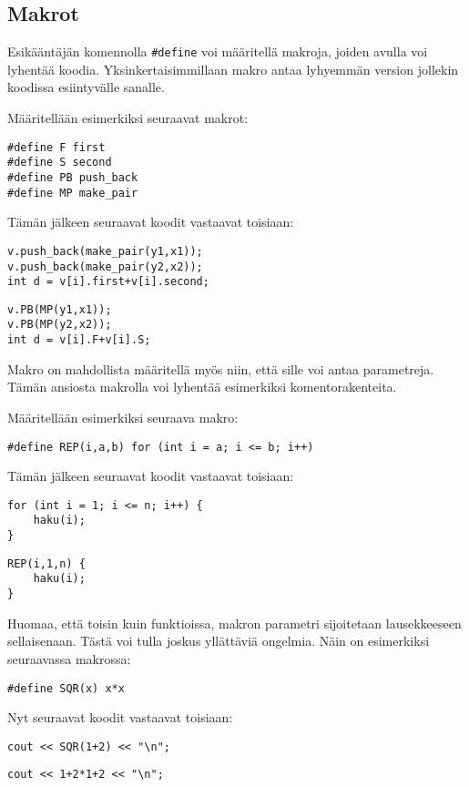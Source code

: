 \subsection{Makrot}

Esikääntäjän komennolla \texttt{\#define}
voi määritellä makroja, joiden avulla voi lyhentää
koodia. Yksinkertaisimmillaan makro antaa lyhyemmän
version jollekin koodissa esiintyvälle sanalle.

Määritellään esimerkiksi seuraavat makrot:
\begin{lstlisting}
#define F first
#define S second
#define PB push_back
#define MP make_pair
\end{lstlisting}
Tämän jälkeen seuraavat koodit vastaavat toisiaan:
\begin{lstlisting}
v.push_back(make_pair(y1,x1));
v.push_back(make_pair(y2,x2));
int d = v[i].first+v[i].second;
\end{lstlisting}
\begin{lstlisting}
v.PB(MP(y1,x1));
v.PB(MP(y2,x2));
int d = v[i].F+v[i].S;
\end{lstlisting}
Makro on mahdollista määritellä myös niin,
että sille voi antaa parametreja.
Tämän ansiosta makrolla voi lyhentää esimerkiksi
komentorakenteita.

Määritellään esimerkiksi seuraava makro:
\begin{lstlisting}
#define REP(i,a,b) for (int i = a; i <= b; i++)
\end{lstlisting}
Tämän jälkeen seuraavat koodit vastaavat toisiaan:
\begin{lstlisting}
for (int i = 1; i <= n; i++) {
    haku(i);
}
\end{lstlisting}
\begin{lstlisting}
REP(i,1,n) {
    haku(i);
}
\end{lstlisting}

Huomaa, että toisin kuin funktioissa,
makron parametri sijoitetaan lausekkeeseen
sellaisenaan.
Tästä voi tulla joskus yllättäviä ongelmia.
Näin on esimerkiksi seuraavassa makrossa:

\begin{lstlisting}
#define SQR(x) x*x
\end{lstlisting}

Nyt seuraavat koodit vastaavat toisiaan:

\begin{lstlisting}
cout << SQR(1+2) << "\n";
\end{lstlisting}

\begin{lstlisting}
cout << 1+2*1+2 << "\n";
\end{lstlisting}

